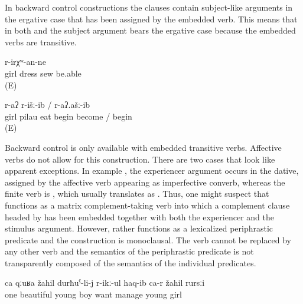 In backward control constructions the clauses contain subject-like arguments in the ergative case that has been assigned by the embedded verb. This means that in both  and  the subject argument bears the ergative case because the embedded verbs are transitive.
%
\begin{exe}
	\ex	\label{ex:‎The girl will be able to sew the dress}
		r-irχʷ-an-ne\\
		girl	dress	sew	be.able\\
	\glt	{} (E)

	\ex	\label{ex:‎The girl began to eat the pilau}
		r-aʔ	r-išː-ib	/	r-aʔ.ašː-ib\\
		girl pilau	eat \tsc{f-}begin	become	/ begin\\
	\glt	{} (E)
\end{exe}

Backward control is only available with embedded transitive verbs. Affective verbs do not allow for this construction. There are two cases that look like apparent exceptions. In example , the experiencer argument occurs in the dative, assigned by the affective verb   appearing as imperfective converb, whereas the finite verb is , which usually translates as . Thus, one might suspect that  functions as a matrix complement-taking verb into which a complement clause headed by  has been embedded together with both the experiencer and the stimulus argument. However,  rather functions as a lexicalized periphrastic predicate and the construction is monoclausal. The verb  cannot be replaced by any other verb and the semantics of the periphrastic predicate is not transparently composed of the semantics of the individual predicates.
%
\begin{exe}
	\ex	\label{ex:‎One beautiful young man fell in love with a young girl}
	\gll	ca	qːuʁa	žahil	durħuˁ-li-j	r-ikː-ul	haq-ib	ca-r	žahil	rursːi\\
		one	beautiful	young	boy	want	manage		young	girl\\
	\glt	{} 
\end{exe}

